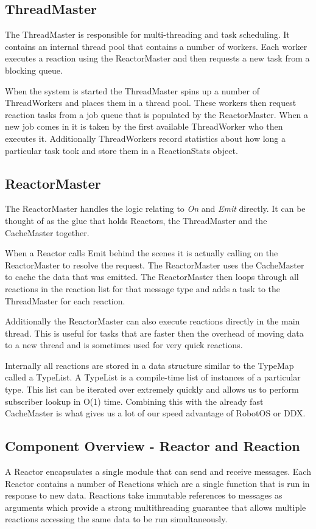 \documentclass[english,12pt]{scrartcl}
\begin{document}
			\subsection{ThreadMaster}				
				The ThreadMaster is responsible for multi-threading and task scheduling.
				It contains an internal thread pool that contains a number of workers. 
				Each worker executes a reaction using the ReactorMaster and then requests a new task from a blocking queue.
				
				When the system is started the ThreadMaster spins up a number of ThreadWorkers and places them in a thread pool.
				These workers then request reaction tasks from a job queue that is populated by the ReactorMaster.
				When a new job comes in it is taken by the first available ThreadWorker who then executes it.
				Additionally ThreadWorkers record statistics about how long a particular task took and store them in a ReactionStats object.
	
			\subsection{ReactorMaster}
				The ReactorMaster handles the logic relating to \emph{On} and \emph{Emit} directly. 
				It can be thought of as the glue that holds Reactors, the ThreadMaster and the CacheMaster together.
				
				When a Reactor calls Emit behind the scenes it is actually calling on the ReactorMaster to resolve the request.
				The ReactorMaster uses the CacheMaster to cache the data that was emitted.
				The ReactorMaster then loops through all reactions in the reaction list for that message type and adds a task to the ThreadMaster for each reaction.
				
				Additionally the ReactorMaster can also execute reactions directly in the main thread. 
				This is useful for tasks that are faster then the overhead of moving data to a new thread and is sometimes used for very quick reactions.
			
				Internally all reactions are stored in a data structure similar to the TypeMap called a TypeList. 
				A TypeList is a compile-time list of instances of a particular type. This list can be iterated over extremely quickly and allows us to perform subscriber lookup in O(1) time.
				Combining this with the already fast CacheMaster is what gives us a lot of our speed advantage of RobotOS or DDX.
		
		\subsection{Component Overview - Reactor and Reaction}
			A Reactor encapsulates a single module that can send and receive messages.
			Each Reactor contains a number of Reactions which are a single function that is run in response to new data. 
			Reactions take immutable references to messages as arguments which provide a strong multithreading guarantee that allows multiple reactions accessing the same data to be run simultaneously.
			
\end{document}
